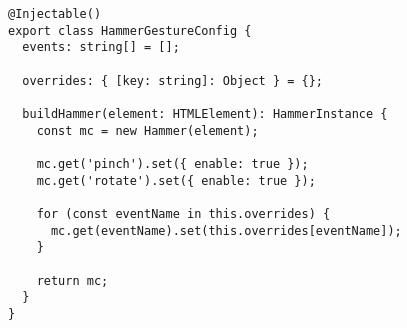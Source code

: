 \begin{verbatim}
@Injectable()
export class HammerGestureConfig {
  events: string[] = [];

  overrides: { [key: string]: Object } = {};

  buildHammer(element: HTMLElement): HammerInstance {
    const mc = new Hammer(element);

    mc.get('pinch').set({ enable: true });
    mc.get('rotate').set({ enable: true });

    for (const eventName in this.overrides) {
      mc.get(eventName).set(this.overrides[eventName]);
    }

    return mc;
  }
}
\end{verbatim}
